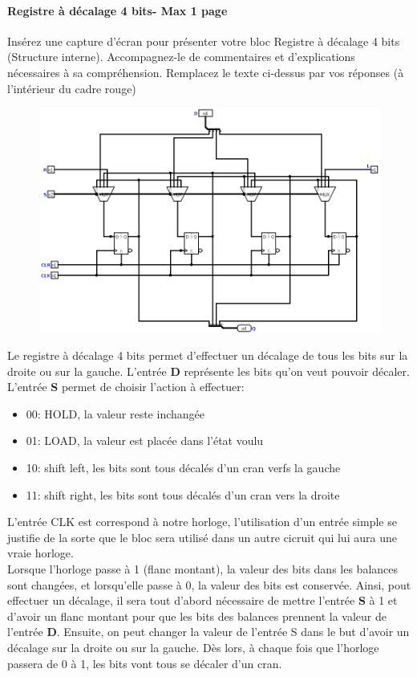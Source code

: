 \documentclass[a4paper]{article} %
\begin{document}
\begin{tcolorbox}[colframe=Monokaimagenta,colback=white]
\paragraph{Registre à décalage 4 bits- Max 1 page } %
Insérez une capture d’écran pour présenter votre bloc Registre à décalage 4 bits (Structure interne).
Accompagnez-le de commentaires et d’explications nécessaires à sa compréhension.
Remplacez le texte ci-dessus par vos réponses (à l’intérieur du cadre rouge)\\ 

\begin{figure}[H]
    \centering
    \includegraphics[width=.8\textwidth]{src/SHREGI_4BITS.png}
    \label{fig:SHREGI_4}
\end{figure}

Le registre à décalage 4 bits permet d'effectuer un décalage de tous les bits sur la droite ou sur la gauche. L'entrée \textbf{D} représente les bits qu'on veut pouvoir décaler.
L'entrée \textbf{S} permet de choisir l'action à effectuer: 
\begin{itemize}
    \item 00: HOLD, la valeur reste inchangée
    \item 01: LOAD, la valeur est placée dans l'état voulu
    \item 10: shift left, les bits sont tous décalés d'un cran verfs la gauche
    \item 11: shift right, les bits sont tous décalés d'un cran vers la droite
\end{itemize}
\vspace{1em}
L'entrée CLK est correspond à notre horloge, l'utilisation d'un entrée simple se justifie de la sorte que le bloc sera utilisé dans un autre cicruit qui lui aura une vraie horloge.\\
Lorsque l'horloge passe à 1 (flanc montant), la valeur des bits dans les balances sont changées, et lorsqu'elle passe à 0, la valeur des bits est conservée.
Ainsi, pout effectuer un décalage, il sera tout d'abord nécessaire de mettre l'entrée \textbf{S} à 1 et d'avoir un flanc montant pour que les bits des balances prennent la valeur de l'entrée \textbf{D}. Ensuite, on peut changer la valeur de l'entrée S dans le but d'avoir un décalage sur la droite ou sur la gauche. Dès lors, à chaque fois que l'horloge passera de 0 à 1, les bits vont tous se décaler d'un cran.
    

\end{tcolorbox}
\end{document}
